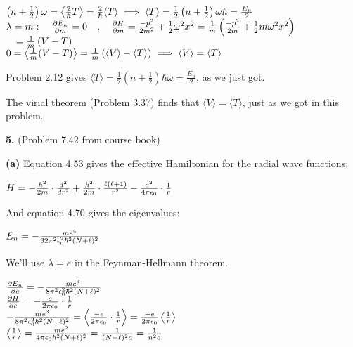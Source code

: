 \documentclass[14pt]{extarticle}
\makeatletter
\newenvironment{lefteqs}{%
    \begin{flushleft}%
    \renewcommand{\arraystretch}{1.3}%
    $\begin{array}{@{}l@{}}%
}{%
    \end{array}$%
    \end{flushleft}%
}
\makeatother
\begin{document}
\begin{lefteqs}
    \left( n + \frac{1}{2} \right) \omega = \left\langle \frac{2}{\hbar} T \right\rangle = \frac{2}{\hbar} \langle T \rangle
    \implies \langle T \rangle = \frac{1}{2} \left( n + \frac{1}{2} \right) \omega \hbar = \frac{E_n}{2} \\
    \lambda = m : \quad \frac{\partial E_n}{\partial m} = 0
    \quad , \quad
    \frac{\partial H}{\partial m} = \frac{-p^2}{2m^2} + \frac{1}{2} \omega^2 x^2
    = \frac{1}{m} \left( \frac{-p^2}{2m} + \frac{1}{2} m \omega^2 x^2 \right) \\
    \quad = \frac{1}{m} \left( V - T \right) \\
    0 = \left\langle \frac{1}{m} (V - T) \right\rangle = \frac{1}{m} \left( \langle V \rangle - \langle T \rangle \right)
    \implies \langle V \rangle = \langle T \rangle
\end{lefteqs}

Problem 2.12 gives $\langle T \rangle = \frac{1}{2} \left( n + \frac{1}{2} \right) \hbar \omega = \frac{E_n}{2}$, as we just got.

The virial theorem (Problem 3.37) finds that $\langle V \rangle = \langle T \rangle$, just as we got in this problem.

\newpage

\textbf{\large 5.}
(Problem 7.42 from course book)

\textbf{(a)}
Equation 4.53 gives the effective Hamiltonian for the radial wave functions:

\begin{lefteqs}
    H = -\frac{\hbar^2}{2m} \cdot \frac{d^2}{dr^2} + \frac{\hbar^2}{2m} \cdot \frac{\ell(\ell+1)}{r^2} - \frac{e^2}{4 \pi \epsilon_0} \cdot \frac{1}{r}
\end{lefteqs}

And equation 4.70 gives the eigenvalues:

\begin{lefteqs}
    E_n = -\frac{m e^4}{32 \pi^2 \epsilon_0^2 \hbar^2 (N + \ell)^2}
\end{lefteqs}

We'll use $\lambda = e$ in the Feynman-Hellmann theorem.

\begin{lefteqs}
    \frac{\partial E_n}{\partial e} = -\frac{m e^3}{8 \pi^2 \epsilon_0^2 \hbar^2 (N + \ell)^2} \\
    \frac{\partial H}{\partial e} = -\frac{e}{2 \pi \epsilon_0} \cdot \frac{1}{r} \\
    -\frac{m e^3}{8 \pi^2 \epsilon_0^2 \hbar^2 (N + \ell)^2} = \left\langle \frac{-e}{2 \pi \epsilon_0} \cdot \frac{1}{r} \right\rangle = \frac{-e}{2 \pi \epsilon_0} \left\langle \frac{1}{r} \right\rangle \\
    \left\langle \frac{1}{r} \right\rangle = \frac{m e^2}{4 \pi \epsilon_0 \hbar^2 (N + \ell)^2} = \frac{1}{(N + \ell)^2 a} = \frac{1}{n^2 a}
\end{lefteqs}
\end{document}
